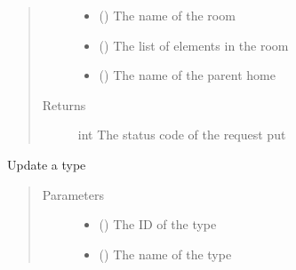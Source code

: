 \documentclass[letterpaper,10pt,english]{sphinxmanual}
\begin{document}
\begin{fulllineitems}
\begin{fulllineitems}
\begin{quote}
\begin{description}
\begin{itemize}
\item {} 
\sphinxAtStartPar
{} () \textendash{} The name of the room

\item {} 
\sphinxAtStartPar
{} () \textendash{} The list of elements in the room

\item {} 
\sphinxAtStartPar
{} () \textendash{} The name of the parent home

\end{itemize}

\item[{Returns}] \leavevmode
\sphinxAtStartPar
int \textendash{} The status code of the request put

\end{description}\end{quote}

\end{fulllineitems}


\begin{fulllineitems}
\label{\detokenize{index:Api.Api.update_type}}
\sphinxAtStartPar
Update a type
\begin{quote}\begin{description}
\item[{Parameters}] \leavevmode\begin{itemize}
\item {} 
\sphinxAtStartPar
{} () \textendash{} The ID of the type

\item {} 
\sphinxAtStartPar
{} () \textendash{} The name of the type


\end{itemize}
\end{description}
\end{quote}
\end{fulllineitems}
\end{fulllineitems}
\end{document}
